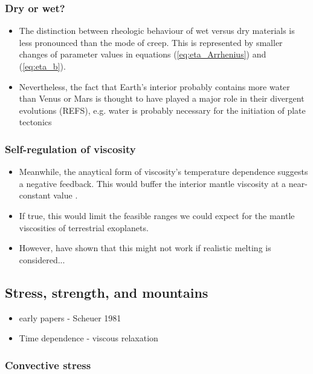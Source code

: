 \subsubsection{Dry or wet?}

\begin{itemize}
\item The distinction between rheologic behaviour of wet versus dry materials is less pronounced than the mode of creep. This is represented by smaller changes of parameter values in equations (\ref{eq:eta_Arrhenius}) and (\ref{eq:eta_b}).
\item Nevertheless, the fact that Earth's interior probably contains more water than Venus or Mars is thought to have played a major role in their divergent evolutions (REFS), e.g. water is probably necessary for the initiation of plate tectonics
\end{itemize} 


\subsubsection{Self-regulation of viscosity}

\begin{itemize}
\item Meanwhile, the anaytical form of viscosity's temperature dependence suggests a negative feedback. This would buffer the interior mantle viscosity at a near-constant value \citet{Solomatov1996a, Turcotte2014}.
\item If true, this would limit the feasible ranges we could expect for the mantle viscosities of terrestrial exoplanets.
\item However, \citep{Korenaga?} have shown that this might not work if realistic melting is considered...
\end{itemize}


\subsection{Stress, strength, and mountains}

\begin{itemize}
\item early papers - Scheuer 1981
\item Time dependence - viscous relaxation
\end{itemize}

\subsubsection{Convective stress}

